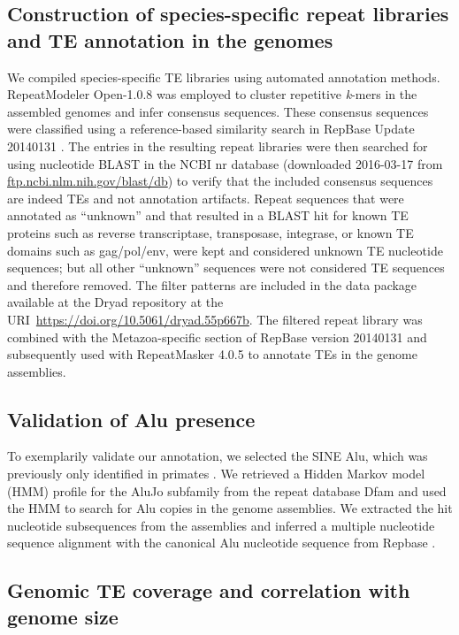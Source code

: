 \subsection{Construction of species-specific repeat libraries and TE
annotation in the genomes}

We compiled species-specific TE libraries using automated annotation
methods. RepeatModeler Open-1.0.8 \citep{Smit2015} was employed to
cluster repetitive \emph{k}-mers in the assembled genomes and infer
consensus sequences. These consensus sequences were classified using a
reference-based similarity search in RepBase Update 20140131
\citep{Jurka2005}. The entries in the resulting repeat libraries were
then searched for using nucleotide BLAST in the NCBI nr database
(downloaded 2016-03-17 from
\href{ftp://ftp.ncbi.nlm.nih.gov/blast/db}{ftp.ncbi.nlm.nih.gov/blast/db})
to verify that the included consensus sequences are indeed TEs and not
annotation artifacts. Repeat sequences that were annotated as
``unknown'' and that resulted in a BLAST hit for known TE proteins such
as reverse transcriptase, transposase, integrase, or known TE domains
such as gag/pol/env, were kept and considered unknown TE nucleotide
sequences; but all other ``unknown'' sequences were not considered TE
sequences and therefore removed. The filter patterns are included in the data
package available at the Dryad repository at the URI~\url{https://doi.org/10.5061/dryad.55p667b}. The filtered repeat library was combined with the
Metazoa-specific section of RepBase version 20140131 and subsequently used with
RepeatMasker 4.0.5 \citep{Smit2015} to annotate TEs in the genome assemblies.

\subsection{Validation of Alu
presence}

To exemplarily validate our annotation, we selected the SINE Alu, which
was previously only identified in primates \citep{Kriegs2007}. We
retrieved a Hidden Markov model (HMM) profile for the AluJo subfamily
from the repeat database Dfam \citep{Hubley2015} and used the HMM to
search for Alu copies in the genome assemblies. We extracted the hit
nucleotide subsequences from the assemblies and inferred a multiple
nucleotide sequence alignment with the canonical Alu nucleotide sequence
from Repbase \citep{Jurka2005}.

\subsection{Genomic TE coverage and correlation with genome
size}

